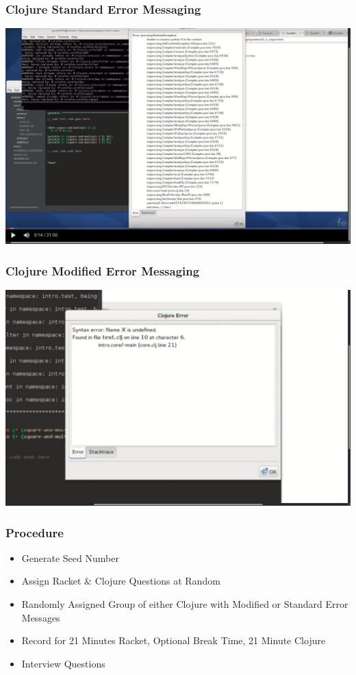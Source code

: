 \documentclass{beamer}
\begin{document}
\begin{frame}
  \frametitle{Clojure Standard Error Messaging}
  \includegraphics[scale=.17]{CS20Sshot}
\end{frame}

\begin{frame}
  \frametitle{Clojure Modified Error Messaging}
  \includegraphics[scale=.17]{CM16shot}
\end{frame}

\begin{frame}
  \frametitle{Procedure}
\begin{itemize}

\item Generate Seed Number
\item Assign Racket \& Clojure Questions at Random
\item Randomly Assigned Group of either Clojure with Modified or Standard Error Messages
\item Record for 21 Minutes Racket, Optional Break Time, 21 Minute Clojure
\item Interview Questions
  
\end{itemize}  
\end{frame}
\end{document}
